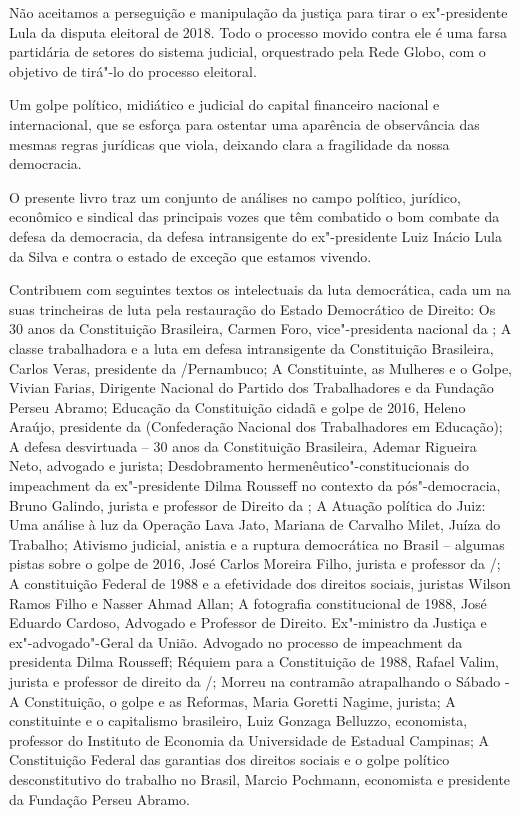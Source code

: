 Não aceitamos a perseguição e manipulação da justiça para tirar o ex"-presidente Lula
da disputa eleitoral de 2018. Todo o processo movido contra ele é uma
farsa partidária de setores do sistema judicial, orquestrado pela Rede Globo, com
o objetivo de tirá"-lo do processo eleitoral.

Um golpe político, midiático e judicial do capital financeiro nacional e internacional, que
se esforça para ostentar uma aparência de observância das mesmas regras jurídicas que
viola, deixando clara a fragilidade da nossa democracia.

\asterisc

O presente livro traz um conjunto de análises no campo político,
jurídico, econômico e sindical das principais vozes que têm combatido o bom combate da defesa
da democracia, da defesa intransigente do ex"-presidente Luiz Inácio Lula da Silva e
contra o estado de exceção que estamos vivendo.

Contribuem com seguintes textos os intelectuais da luta democrática, cada um na suas trincheiras
de luta pela restauração do Estado Democrático de Direito: Os 30 anos da Constituição Brasileira,
Carmen Foro, vice"-presidenta nacional da ; A classe trabalhadora e a luta em defesa
intransigente da Constituição Brasileira, Carlos Veras, presidente da /Pernambuco;
A Constituinte, as Mulheres e o Golpe, Vivian Farias, Dirigente Nacional do Partido dos
Trabalhadores e da Fundação Perseu Abramo; Educação da Constituição cidadã e golpe de 2016,
Heleno Araújo, presidente da  (Confederação Nacional dos Trabalhadores em Educação);
A defesa desvirtuada – 30 anos da Constituição Brasileira, Ademar Rigueira Neto, advogado e
jurista; Desdobramento hermenêutico"-constitucionais do impeachment da ex"-presidente Dilma
Rousseff no contexto da pós"-democracia, Bruno Galindo, jurista e professor de Direito da
; A Atuação política do Juiz: Uma análise à luz da Operação Lava Jato, Mariana
de Carvalho Milet, Juíza do Trabalho; Ativismo judicial, anistia e a ruptura democrática no
Brasil – algumas pistas sobre o golpe de 2016, José Carlos Moreira Filho, jurista e professor da
/;  A constituição  Federal de 1988 e a efetividade dos direitos sociais,
juristas Wilson Ramos Filho e Nasser Ahmad Allan;  A fotografia constitucional de 1988, José
Eduardo Cardoso, Advogado e Professor de Direito. Ex"-ministro da Justiça e ex"-advogado"-Geral da
União. Advogado no processo de impeachment da presidenta Dilma Rousseff; Réquiem para a
Constituição de 1988, Rafael Valim, jurista e professor de direito da /;
Morreu na contramão atrapalhando o Sábado - A Constituição, o golpe e as Reformas, Maria Goretti
Nagime, jurista; A constituinte e o capitalismo brasileiro, Luiz Gonzaga Belluzzo, economista,
professor do Instituto de Economia da Universidade de Estadual Campinas; A Constituição Federal
das garantias dos direitos sociais e o golpe político desconstitutivo do trabalho no Brasil,
Marcio Pochmann, economista e presidente da Fundação Perseu Abramo.

